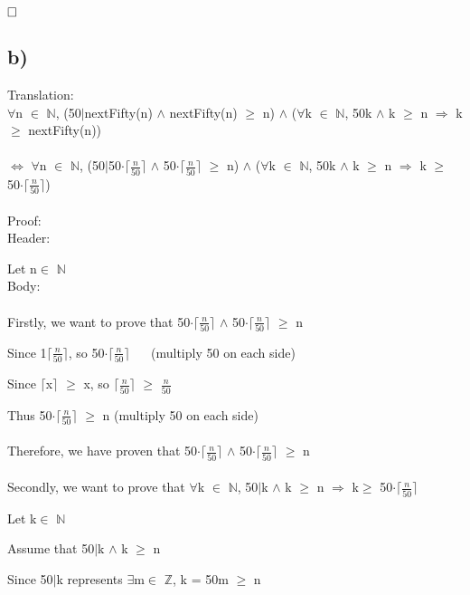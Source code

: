 \documentclass[12pt]{article}
\begin{document}
$\hfill\square$

\newpage

\subsection*{b)}
\vspace{20pt}
Translation: \\
$\forall$n $\in$ $\mathbb{N}$, (50$\mid$nextFifty(n) $\wedge$ nextFifty(n) $\geq$ n) $\wedge$ ($\forall$k $\in$ $\mathbb{N}$, 50\textbar k $\wedge$ k $\geq$ n $\Rightarrow$ k $\geq$ nextFifty(n)) \\
~\\
$\Leftrightarrow$ $\forall$n $\in$ $\mathbb{N}$, (50$\mid$50$\cdot$$\lceil$$\frac{n}{50}$$\rceil$ $\wedge$ 50$\cdot$$\lceil$$\frac{n}{50}$$\rceil$ $\geq$ n) $\wedge$ ($\forall$k $\in$ $\mathbb{N}$, 50\textbar k $\wedge$ k $\geq$ n $\Rightarrow$ k $\geq$ 50$\cdot$$\lceil$$\frac{n}{50}$$\rceil$) \\
~\\
Proof: \\
Header:

Let n$\in$ $\mathbb{N}$\\
Body:\\
~\\
Firstly, we want to prove that 50$\cdot$$\lceil$$\frac{n}{50}$$\rceil$ $\wedge$ 50$\cdot$$\lceil$$\frac{n}{50}$$\rceil$ $\geq$ n

Since 1\textbar$\lceil$$\frac{n}{50}$$\rceil$, so 50$\cdot$$\lceil$$\frac{n}{50}$$\rceil$ $\quad$ (multiply 50 on each side)

Since $\lceil$x$\rceil$ $\geq$ x, so $\lceil$$\frac{n}{50}$$\rceil$ $\geq$ $\frac{n}{50}$

Thus 50$\cdot$$\lceil$$\frac{n}{50}$$\rceil$ $\geq$ n (multiply 50 on each side) \\
~\\
Therefore, we have proven that 50$\cdot$$\lceil$$\frac{n}{50}$$\rceil$ $\wedge$ 50$\cdot$$\lceil$$\frac{n}{50}$$\rceil$ $\geq$ n \\
~\\
Secondly, we want to prove that $\forall$k $\in$ $\mathbb{N}$, 50$\mid$k $\wedge$ k $\geq$ n $\Rightarrow$ k$\geq$ 50$\cdot$$\lceil$$\frac{n}{50}$$\rceil$ 

Let k$\in$ $\mathbb{N}$

Assume that 50$\mid$k $\wedge$ k $\geq$ n

Since 50$\mid$k represents $\exists$m$\in$ $\mathbb{Z}$, k = 50m $\geq$ n
\end{document}
